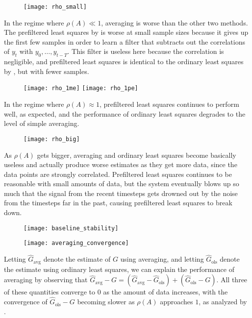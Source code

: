\begin{figure}
\texttt{[image: rho\_small]}
\end{figure}
In the regime where $\rho(A) \ll 1$,
averaging is worse than the other two methods.
The prefiltered least squares by \cite{simchowitz2019parametric}
is worse at small sample sizes because
it gives up the first few samples in order to learn a filter
that subtracts out the correlations of $y_t$
with $y_0, \ldots, y_{t-T}$.
This filter is useless here because the correlation is negligible,
and prefiltered least squares is identical to
the ordinary least squares by \cite{oymak2019singletraj},
but with fewer samples.

\begin{figure}
\texttt{[image: rho\_1me]}
\texttt{[image: rho\_1pe]}
\end{figure}
In the regime where $\rho(A) \approx 1$,
prefiltered least squares continues to perform well, as expected,
and the performance of ordinary least squares
degrades to the level of simple averaging.

\begin{figure}
\texttt{[image: rho\_big]}
\end{figure}
As $\rho(A)$ gets bigger, averaging and ordinary least squares
become basically useless
and actually produce worse estimates as they get more data,
since the data points are strongly correlated.
Prefiltered least squares continues to be reasonable
with small amounts of data,
but the system eventually blows up so much
that the signal from the recent timesteps
gets drowned out by the noise from the timesteps
far in the past, causing prefiltered least squares to break down.

\begin{figure}
\texttt{[image: baseline\_stability]}
\end{figure}

\begin{figure}
\texttt{[image: averaging\_convergence]}
\end{figure}
Letting $\hat G_{\text{avg}}$ denote the estimate of $G$ using averaging,
and letting $\hat G_{\text{ols}}$ denote the estimate
using ordinary least squares,
we can explain the performance of averaging by observing that
$\hat G_{\text{avg}} - G
= (\hat G_{\text{avg}} - \hat G_{\text{ols}}) + (\hat G_{\text{ols}} - G)$.
All three of these quantities converge to $0$
as the amount of data increases,
with the convergence of $\hat G_{\text{ols}} - G$
becoming slower as $\rho(A)$ approaches $1$,
as analyzed by \cite{oymak2019singletraj}.

